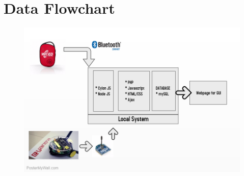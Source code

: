 \documentclass[a4paper,12pt,oneside]{book}
\begin{document}
\section{Data Flowchart}
  \begin{figure}[h]
        \centering
    	\includegraphics[scale=0.5]{Flowchart.jpg}
	    \end{figure}
\end{document}
